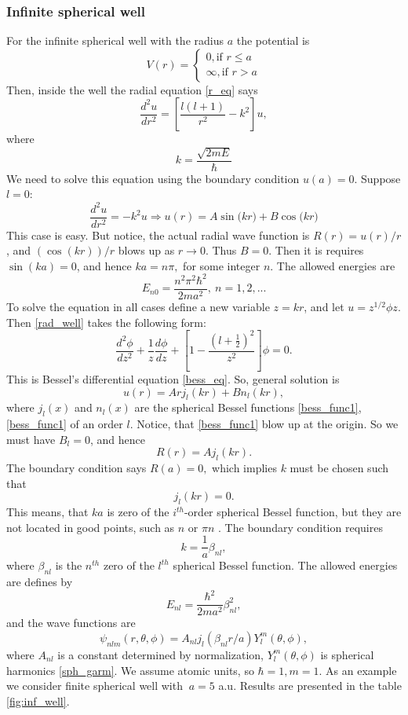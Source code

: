 \documentclass[a4paper, 12pt]{article}
\begin{document}
\subsubsection{Infinite spherical well}
For the infinite spherical well with the radius $a$ the potential is
$$V(r)= \begin{cases}
0, \text{if } r\leq a\\
\infty, \text{if } r>a
\end{cases}$$
Then, inside the well the radial equation \eqref{r_eq} says
\begin{equation}\label{rad_well}
\frac{d^2 u}{dr^2} = [\frac{l(l+1)}{r^2} - k^2]u,
\end{equation}
where
$$k = \frac{\sqrt{2mE}}{\hbar}$$
We need to solve this equation using the boundary condition $u(a) = 0.$
Suppose  $l=0$:
$$\frac{d^2 u}{dr^2} = -k^2 u \Rightarrow u(r) = A \sin{(kr})+B\cos{(kr})$$
This case is easy. But notice, the actual radial wave function is $R(r)= u(r)/r$, and $(\cos (kr))/r$ blows up as  $r \to 0.$ Thus $B =0.$ Then it is requires $\sin (ka) =0$, and hence $ka = n \pi,$ for some integer $n$. The allowed energies are
$$E_{n0} = \frac{n^2 \pi^2 \hbar^2}{2 ma^2}, ~ n = 1,2,...$$
To solve the equation in all cases define a new variable $z= k r$, and let  $u = z^{1/2}\phi{z}.$
Then \eqref{rad_well} takes the following form:
$$\frac{d^2 \phi}{dz^2}+\frac{1}{z}\frac{d \phi}{dz}+[1 - \frac{(l+\frac{1}{2})^2}{z^2}]\phi = 0.$$
This is Bessel's differential equation \eqref{bess_eq}. So, general solution is
$$u(r)=Ar j_l(kr)+Bn_l(kr),$$
where $j_l(x)$ and  $n_l(x)$ are the spherical Bessel functions \eqref{bess_func1}, \eqref{bess_func1} of an order $l$.
Notice, that  \eqref{bess_func1} blow up at the origin. So we must have $B_l=0$, and hence
$$R(r)=A j_l(kr).$$
The boundary condition says $R(a)=0,$ which implies $k$ must be chosen such that
$$j_l(kr)=0.$$
This means, that $ka$ is zero of the $i^{th}$-order spherical Bessel function, but  they are not located in good points, such as $n$ or $\pi n$ . The boundary condition requires 
$$k = \frac{1}{a}\beta_{nl},$$
where $\beta_{nl}$ is the $n^{th}$ zero of the  $l^{th}$  spherical Bessel function. The allowed energies are defines by
\begin{equation}\label{sol_inf_well}
E_{nl}=\frac{\hbar^2}{2ma^2}\beta_{nl}^2,
\end{equation}
and the wave functions are
$$\psi_{nlm}(r, \theta,\phi) = A_{nl} j_l(\beta_{nl}r/a) Y_l^m(\theta, \phi),$$
where $A_{nl}$ is a constant determined by normalization, $Y_l^m(\theta, \phi)$ is spherical harmonics \eqref{sph_garm}.
We assume atomic units, so $\hbar = 1, m=1.$ As an example we consider finite spherical well with $\ a = 5 $ a.u. Results are presented in the  table \ref{fig:inf_well}.
\end{document}
